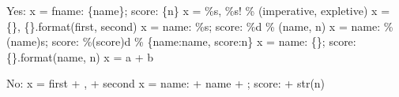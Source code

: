 \documentclass[
]{article}
\newenvironment{Shaded}{}{}
\newcommand{\BuiltInTok}[1]{\textcolor[rgb]{0.00,0.50,0.00}{#1}}
\newcommand{\NormalTok}[1]{#1}
\newcommand{\OperatorTok}[1]{\textcolor[rgb]{0.40,0.40,0.40}{#1}}
\newcommand{\SpecialCharTok}[1]{\textcolor[rgb]{0.25,0.44,0.63}{#1}}
\newcommand{\SpecialStringTok}[1]{\textcolor[rgb]{0.73,0.40,0.53}{#1}}
\newcommand{\StringTok}[1]{\textcolor[rgb]{0.25,0.44,0.63}{#1}}
\begin{document}
\begin{samepage}
\begin{Shaded}
\begin{Highlighting}[]
\NormalTok{Yes: x }\OperatorTok{=} \SpecialStringTok{f\textquotesingle{}name: }\SpecialCharTok{\{}\NormalTok{name}\SpecialCharTok{\}}\SpecialStringTok{; score: }\SpecialCharTok{\{}\NormalTok{n}\SpecialCharTok{\}}\SpecialStringTok{\textquotesingle{}}
\NormalTok{     x }\OperatorTok{=} \StringTok{\textquotesingle{}}\SpecialCharTok{\%s}\StringTok{, }\SpecialCharTok{\%s}\StringTok{!\textquotesingle{}} \OperatorTok{\%}\NormalTok{ (imperative, expletive)}
\NormalTok{     x }\OperatorTok{=} \StringTok{\textquotesingle{}}\SpecialCharTok{\{\}}\StringTok{, }\SpecialCharTok{\{\}}\StringTok{\textquotesingle{}}\NormalTok{.}\BuiltInTok{format}\NormalTok{(first, second)}
\NormalTok{     x }\OperatorTok{=} \StringTok{\textquotesingle{}name: }\SpecialCharTok{\%s}\StringTok{; score: }\SpecialCharTok{\%d}\StringTok{\textquotesingle{}} \OperatorTok{\%}\NormalTok{ (name, n)}
\NormalTok{     x }\OperatorTok{=} \StringTok{\textquotesingle{}name: }\SpecialCharTok{\%(name)s}\StringTok{; score: }\SpecialCharTok{\%(score)d}\StringTok{\textquotesingle{}} \OperatorTok{\%}\NormalTok{ \{}\StringTok{\textquotesingle{}name\textquotesingle{}}\NormalTok{:name, }\StringTok{\textquotesingle{}score\textquotesingle{}}\NormalTok{:n\}}
\NormalTok{     x }\OperatorTok{=} \StringTok{\textquotesingle{}name: }\SpecialCharTok{\{\}}\StringTok{; score: }\SpecialCharTok{\{\}}\StringTok{\textquotesingle{}}\NormalTok{.}\BuiltInTok{format}\NormalTok{(name, n)}
\NormalTok{     x }\OperatorTok{=}\NormalTok{ a }\OperatorTok{+}\NormalTok{ b}
\end{Highlighting}
\end{Shaded}
\end{samepage}

\begin{samepage}
\begin{Shaded}
\begin{Highlighting}[]
\NormalTok{No: x }\OperatorTok{=}\NormalTok{ first }\OperatorTok{+} \StringTok{\textquotesingle{}, \textquotesingle{}} \OperatorTok{+}\NormalTok{ second}
\NormalTok{    x }\OperatorTok{=} \StringTok{\textquotesingle{}name: \textquotesingle{}} \OperatorTok{+}\NormalTok{ name }\OperatorTok{+} \StringTok{\textquotesingle{}; score: \textquotesingle{}} \OperatorTok{+} \BuiltInTok{str}\NormalTok{(n)}
\end{Highlighting}
\end{Shaded}
\end{samepage}
\end{document}
